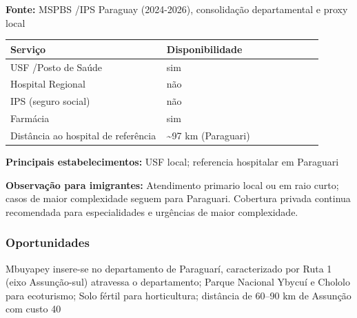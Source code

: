 \textbf{Fonte:} MSPBS /\allowbreak  IPS Paraguay (2024-2026), consolidação
departamental e proxy local

{\def\LTcaptype{none} %
\begin{longtable}{@{}>{\raggedright\arraybackslash}p{0.45\linewidth} >{\raggedright\arraybackslash}p{0.45\linewidth}@{}}
\toprule\noalign{}
Serviço & Disponibilidade \\
\midrule\noalign{}
\endhead
\bottomrule\noalign{}
\endlastfoot
USF /\allowbreak  Posto de Saúde & sim \\
Hospital Regional & não \\
IPS (seguro social) & não \\
Farmácia & sim \\
Distância ao hospital de referência & \textasciitilde97 km
(Paraguari) \\
\end{longtable}
}

\textbf{Principais estabelecimentos:} USF local; referencia hospitalar
em Paraguari

\textbf{Observação para imigrantes:} Atendimento primario local ou em
raio curto; casos de maior complexidade seguem para Paraguari. Cobertura
privada continua recomendada para especialidades e urgências de maior
complexidade.
\newpage

\subsubsection*{Oportunidades}\label{oport-mbuyapey-0908}
Mbuyapey insere-se no departamento de Paraguarí, caracterizado por Ruta 1 (eixo Assunção-sul) atravessa o departamento; Parque Nacional Ybycuí e Chololo para ecoturismo; Solo fértil para horticultura; distância de 60–90 km de Assunção com custo 40%

